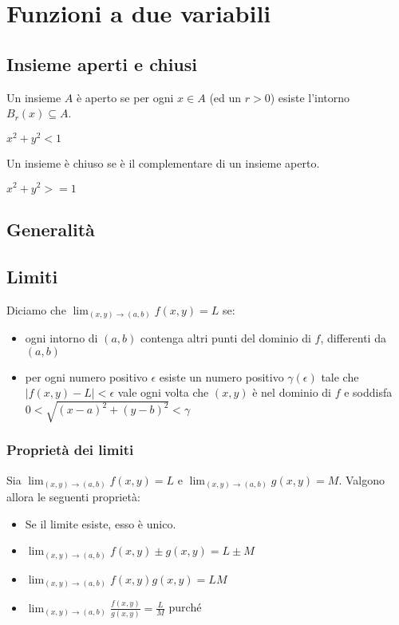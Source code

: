 \chapter{Funzioni a due variabili}

\section{Insieme aperti e chiusi}

\begin{definition}
Un insieme $A$ è aperto se per ogni $x \in A$ (ed un $r>0$) esiste l'intorno $B_r(x) \subseteq A$.
\end{definition}

\begin{example}
$x^2+y^2<1$
\end{example}

\begin{definition}
Un insieme è chiuso se è il complementare di un insieme aperto.
\end{definition}

\begin{example}
$x^2+y^2>=1$
\end{example}

\section{Generalità}

\section{Limiti}

Diciamo che $\lim_{(x,y)\to(a,b)} f(x,y) = L$ se:
\begin{itemize}
\item ogni intorno di $(a,b)$ contenga altri punti del dominio di $f$, differenti da $(a,b)$
\item per ogni numero positivo $\epsilon$ esiste un numero positivo $\gamma(\epsilon)$ tale che $|f(x,y)-L|<\epsilon$ vale ogni volta che $(x,y)$ è nel dominio di $f$ e soddisfa $0<\sqrt{(x-a)^2+(y-b)^2}<\gamma$
\end{itemize}

\subsection{Proprietà dei limiti}
Sia $\lim_{(x,y)\to(a,b)} f(x,y) = L$ e $\lim_{(x,y)\to(a,b)} g(x,y) = M$. Valgono allora le seguenti proprietà:
\begin{itemize}
\item Se il limite esiste, esso è unico.
\item $\lim_{(x,y)\to(a,b)} f(x,y) \pm g(x,y) = L \pm M$
\item $\lim_{(x,y)\to(a,b)} f(x,y) g(x,y) = LM$
\item $\lim_{(x,y)\to(a,b)} \frac{f(x,y)}{g(x,y)} = \frac{L}{M}$ purché 
\end{itemize}

